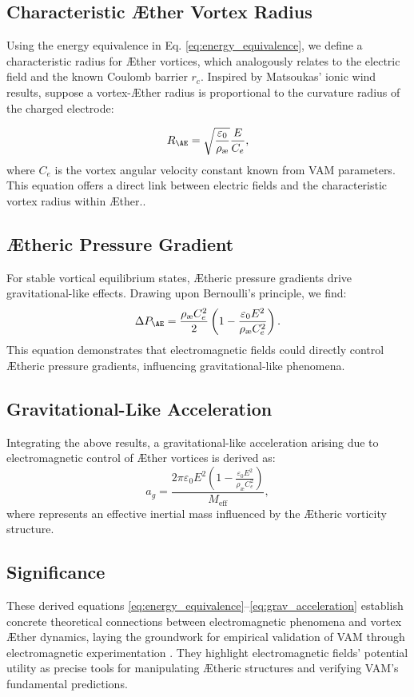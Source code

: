 \subsection{Characteristic Æther Vortex Radius}
Using the energy equivalence in Eq. \eqref{eq:energy_equivalence}, we define a characteristic radius  for Æther vortices, which analogously
relates to the electric field and the known Coulomb barrier $r_c$.  Inspired by Matsoukas' ionic wind results, suppose a vortex-Æther radius is
proportional to the curvature radius of the charged electrode:

\begin{equation}\label{eq:vortex_radius}
R_{\AE} = \sqrt{\frac{\varepsilon_0}{\rho_{\text{\ae}}}}\frac{E}{C_e},
\end{equation}
where $C_e$ is the vortex angular velocity constant known from VAM parameters.
This equation offers a direct link between electric fields and the characteristic vortex radius within Æther.\cite{RelationsBetweenConstants2005}.
\subsection{Ætheric Pressure Gradient}
For stable vortical equilibrium states, Ætheric pressure gradients drive gravitational-like effects. Drawing upon Bernoulli’s principle, we find:
\begin{equation}\label{eq:pressure_gradient}
\Delta P_{\AE} = \frac{\rho_{\text{\ae}} C_e^2}{2}\left(1 - \frac{\varepsilon_0 E^2}{\rho_{\text{\ae}} C_e^2}\right).
\end{equation}
This equation demonstrates that electromagnetic fields could directly control Ætheric pressure gradients, influencing gravitational-like phenomena.
\subsection{Gravitational-Like Acceleration}
Integrating the above results, a gravitational-like acceleration  arising due to electromagnetic control of Æther vortices is derived as:
\begin{equation}\label{eq:grav_acceleration}
a_{g} = \frac{2\pi \varepsilon_0 E^2\left(1 - \frac{\varepsilon_0 E^2}{\rho_{\text{\ae}}C_e^2}\right)}{M_{\text{eff}}},
\end{equation}
where  represents an effective inertial mass influenced by the Ætheric vorticity structure.
\subsection{Significance}
These derived equations \eqref{eq:energy_equivalence}--\eqref{eq:grav_acceleration} establish concrete theoretical connections between electromagnetic phenomena and vortex Æther dynamics, laying the groundwork for empirical validation of VAM through electromagnetic experimentation \cite{Podkletnov2007, Kleckner2013}. They highlight electromagnetic fields' potential utility as precise tools for manipulating Ætheric structures and verifying VAM's fundamental predictions.